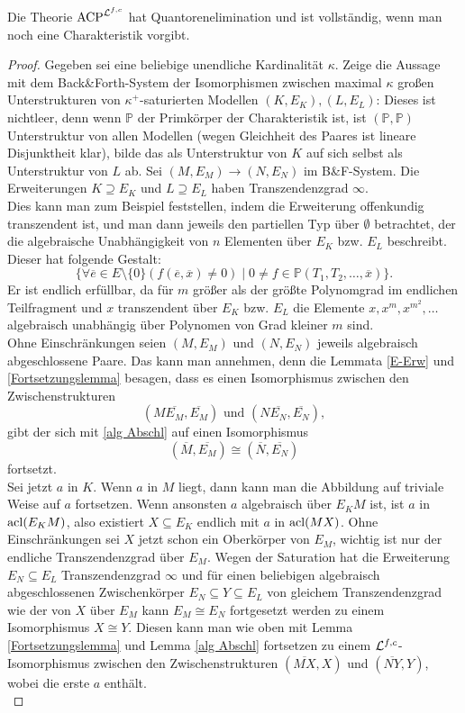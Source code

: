     \begin{theorem}\label{QE}
    	Die Theorie $\operatorname{ACP}^{\mathcal{L}^{f,c}}$ hat Quantorenelimination und ist vollständig, wenn man noch eine Charakteristik vorgibt.
    \end{theorem}
    \begin{proof}
    	Gegeben sei eine beliebige unendliche Kardinalität $\kappa$.
    	Zeige die Aussage mit dem Back\&Forth-System der Isomorphismen zwischen maximal $\kappa$ großen Unterstrukturen von $\kappa^+$-saturierten Modellen $(K,E_K),(L,E_L)$:
    	Dieses ist nichtleer, denn wenn $\mathbb{P}$ der Primkörper der Charakteristik ist, ist $(\mathbb{P},\mathbb{P})$ Unterstruktur von allen Modellen (wegen Gleichheit des Paares ist lineare Disjunktheit klar), bilde das als Unterstruktur von $K$ auf sich selbst als Unterstruktur von $L$ ab.
    	Sei $(M,E_M)\rightarrow(N,E_N)$ im B\&F-System. Die Erweiterungen $K\supseteq E_K$ und $L\supseteq E_L$ haben Transzendenzgrad $\infty$.\\
    	Dies kann man zum Beispiel feststellen, indem die Erweiterung offenkundig transzendent ist, und man dann jeweils den partiellen Typ über $\emptyset$ betrachtet, der die algebraische Unabhängigkeit von $n$ Elementen über $E_K$ bzw. $E_L$ beschreibt. Dieser hat folgende Gestalt:
    	$$\{\forall \overline{e}\in E\setminus\{0\}(f(\overline{e},\overline{x})\neq0)\mid 0\neq f\in\mathbb{P}(T_1,T_2,\dots,\overline{x})\}.$$
    	Er ist endlich erfüllbar, da für $m$ größer als der größte Polynomgrad im endlichen Teilfragment und $x$ transzendent über $E_K$ bzw. $E_L$ die Elemente $x,x^m,x^{m^2},\dots$ algebraisch unabhängig über Polynomen von Grad kleiner $m$ sind.\\
    	Ohne Einschränkungen seien $(M,E_M)$ und $(N,E_N)$ jeweils algebraisch abgeschlossene Paare. Das kann man annehmen, denn die Lemmata \ref{E-Erw} und \ref{Fortsetzungslemma} besagen, dass es einen Isomorphismus zwischen den Zwischenstrukturen $$(M\overline{E_M},\overline{E_M})\text{ und }(N\overline{E_N},\overline{E_N}),$$ gibt der sich mit \ref{alg Abschl} auf einen Isomorphismus $$(\overline{M},\overline{E_M})\cong(\overline{N},\overline{E_N})$$ fortsetzt.\\
    	Sei jetzt $a$ in $K$. Wenn $a$ in $M$ liegt, dann kann man die Abbildung auf triviale Weise auf $a$ fortsetzen.\newpage
    	Wenn ansonsten $a$ algebraisch über $E_KM$ ist, ist $a$ in $\operatorname{acl}(E_KM)$, also existiert $X\subseteq E_K$ endlich mit $a$ in $\operatorname{acl}(MX)$. Ohne Einschränkungen sei $X$ jetzt schon ein Oberkörper von $E_M$, wichtig ist nur der endliche Transzendenzgrad über $E_M$. Wegen der Saturation hat die Erweiterung $E_N\subseteq E_L$ Transzendenzgrad $\infty$ und für einen beliebigen algebraisch abgeschlossenen Zwischenkörper $E_N\subseteq Y\subseteq E_L$ von gleichem Transzendenzgrad wie der von $X$ über $E_M$ kann $E_M\cong E_N$ fortgesetzt werden zu einem Isomorphismus $X\cong Y$. Diesen kann man wie oben mit Lemma \ref{Fortsetzungslemma} und Lemma \ref{alg Abschl} fortsetzen zu einem $\mathcal{L}^{f,c}$-Isomorphismus zwischen den Zwischenstrukturen $(\overline{MX},X)$ und $(\overline{NY},Y)$, wobei die erste $a$ enthält.\\

\end{proof}
